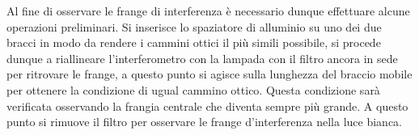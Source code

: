 \documentclass[10pt,a4paper]{article}
\begin{document}
\noindent Al fine di osservare le frange di interferenza è necessario dunque effettuare alcune operazioni preliminari. Si inserisce lo spaziatore di alluminio su uno dei due bracci in modo da rendere i cammini ottici il più simili possibile, si procede dunque a riallineare l'interferometro con la lampada con il filtro ancora in sede per ritrovare le frange, a questo punto si agisce sulla lunghezza del braccio mobile per ottenere la condizione di ugual cammino ottico. Questa condizione sarà verificata osservando la frangia centrale che diventa sempre più grande. A questo punto si rimuove il filtro per osservare le frange d'interferenza nella luce bianca.
 
 
 
 
 
 
 
 
 
 
 
 
 
 
 
 
 
 
 
 
 
 
 
 
 
 
 
 
 
 
\end{document}
